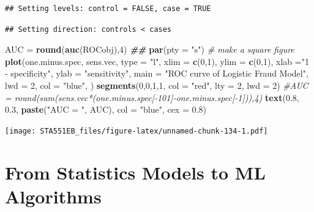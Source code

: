 \documentclass[
]{book}
\newenvironment{Shaded}{\begin{snugshade}}{\end{snugshade}}
\newcommand{\AttributeTok}[1]{\textcolor[rgb]{0.13,0.29,0.53}{#1}}
\newcommand{\CommentTok}[1]{\textcolor[rgb]{0.56,0.35,0.01}{\textit{#1}}}
\newcommand{\DecValTok}[1]{\textcolor[rgb]{0.00,0.00,0.81}{#1}}
\newcommand{\DocumentationTok}[1]{\textcolor[rgb]{0.56,0.35,0.01}{\textbf{\textit{#1}}}}
\newcommand{\FloatTok}[1]{\textcolor[rgb]{0.00,0.00,0.81}{#1}}
\newcommand{\FunctionTok}[1]{\textcolor[rgb]{0.13,0.29,0.53}{\textbf{#1}}}
\newcommand{\NormalTok}[1]{#1}
\newcommand{\OtherTok}[1]{\textcolor[rgb]{0.56,0.35,0.01}{#1}}
\newcommand{\StringTok}[1]{\textcolor[rgb]{0.31,0.60,0.02}{#1}}
\begin{document}
\begin{verbatim}
## Setting levels: control = FALSE, case = TRUE
\end{verbatim}

\begin{verbatim}
## Setting direction: controls < cases
\end{verbatim}

\begin{Shaded}
\begin{Highlighting}[]
\NormalTok{  AUC }\OtherTok{=} \FunctionTok{round}\NormalTok{(}\FunctionTok{auc}\NormalTok{(ROCobj),}\DecValTok{4}\NormalTok{)}
\DocumentationTok{\#\#}
\FunctionTok{par}\NormalTok{(}\AttributeTok{pty =} \StringTok{"s"}\NormalTok{)   }\CommentTok{\# make a square figure}
\FunctionTok{plot}\NormalTok{(one.minus.spec, sens.vec, }\AttributeTok{type =} \StringTok{"l"}\NormalTok{, }\AttributeTok{xlim =} \FunctionTok{c}\NormalTok{(}\DecValTok{0}\NormalTok{,}\DecValTok{1}\NormalTok{), }\AttributeTok{ylim =} \FunctionTok{c}\NormalTok{(}\DecValTok{0}\NormalTok{,}\DecValTok{1}\NormalTok{),}
     \AttributeTok{xlab =}\StringTok{"1 {-} specificity"}\NormalTok{,}
     \AttributeTok{ylab =} \StringTok{"sensitivity"}\NormalTok{,}
     \AttributeTok{main =} \StringTok{"ROC curve of Logistic Fraud Model"}\NormalTok{,}
     \AttributeTok{lwd =} \DecValTok{2}\NormalTok{,}
     \AttributeTok{col =} \StringTok{"blue"}\NormalTok{, )}
\FunctionTok{segments}\NormalTok{(}\DecValTok{0}\NormalTok{,}\DecValTok{0}\NormalTok{,}\DecValTok{1}\NormalTok{,}\DecValTok{1}\NormalTok{, }\AttributeTok{col =} \StringTok{"red"}\NormalTok{, }\AttributeTok{lty =} \DecValTok{2}\NormalTok{, }\AttributeTok{lwd =} \DecValTok{2}\NormalTok{)}
\CommentTok{\#AUC = round(sum(sens.vec*(one.minus.spec[{-}101]{-}one.minus.spec[{-}1])),4)}
\FunctionTok{text}\NormalTok{(}\FloatTok{0.8}\NormalTok{, }\FloatTok{0.3}\NormalTok{, }\FunctionTok{paste}\NormalTok{(}\StringTok{"AUC = "}\NormalTok{, AUC), }\AttributeTok{col =} \StringTok{"blue"}\NormalTok{, }\AttributeTok{cex =} \FloatTok{0.8}\NormalTok{)}
\end{Highlighting}
\end{Shaded}

\texttt{[image: STA551EB\_files/figure-latex/unnamed-chunk-134-1.pdf]}

\hfill\break

\hypertarget{from-statistics-models-to-ml-algorithms}{%
\chapter{From Statistics Models to ML Algorithms}\label{from-statistics-models-to-ml-algorithms}}
\end{document}
